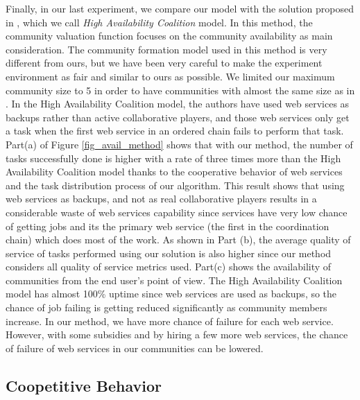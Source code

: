 Finally, in our last experiment, we compare our model with the
solution proposed in \cite{10.1109/TSC.2012.12}, which we call
\emph{High Availability Coalition} model. In this method, the
community valuation function focuses on the community availability
as main consideration. The community formation model used in this
method is very different from ours, but we have been very careful
to make the experiment environment as fair and similar to ours as
possible. We limited our maximum community size to 5 in order to
have communities with almost the same size as in
\cite{10.1109/TSC.2012.12}. In the High Availability Coalition
model, the authors have used web services as backups rather than
active collaborative players, and those web services only get a
task when the first web service in an ordered chain fails to
perform that task. %
Part(a) of Figure \ref{fig_avail_method} shows that with our
method, the number of tasks successfully done is higher with a
rate of three times more than the High Availability Coalition
model thanks to the cooperative behavior of web services and the
task distribution process of our algorithm. This result shows that
using web services as backups, and not as real collaborative
players results in a considerable waste of web services capability
since services have very low chance of getting jobs and its the
primary web service (the first in the coordination chain) which
does most of the work. As shown in Part (b), the average quality
of service of tasks performed using our solution is also higher
since our method considers all quality of service metrics used. Part(c) shows the availability of
communities from the end user's point of view. The High
Availability Coalition model has almost 100\% uptime since web
services are used as backups, so the chance of job failing is
getting reduced significantly as community members increase. In
our method, we have more chance of failure for each web service.
However, with some subsidies and by hiring a few more web
services, the chance of failure of web services in our communities
can be lowered.

\subsection{Coopetitive Behavior}\label{sb:resutlscoop}

